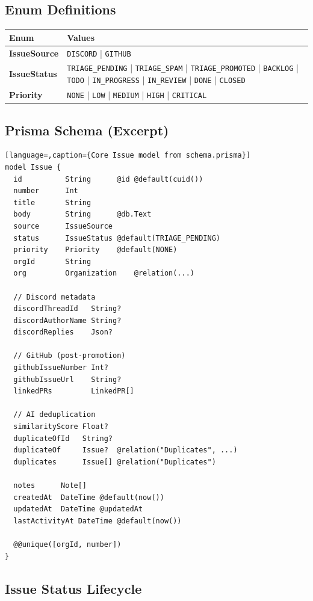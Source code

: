 \documentclass[12pt,a4paper]{report}
\begin{document}
\subsection{Enum Definitions}

\begin{longtable}{>{\bfseries}p{3cm} p{10cm}}
\toprule
Enum & Values \\
\midrule
\endhead
IssueSource & \texttt{DISCORD} | \texttt{GITHUB} \\
IssueStatus & \texttt{TRIAGE\_PENDING} | \texttt{TRIAGE\_SPAM} |
  \texttt{TRIAGE\_PROMOTED} | \texttt{BACKLOG} | \texttt{TODO} |
  \texttt{IN\_PROGRESS} | \texttt{IN\_REVIEW} | \texttt{DONE} |
  \texttt{CLOSED} \\
Priority & \texttt{NONE} | \texttt{LOW} | \texttt{MEDIUM} |
  \texttt{HIGH} | \texttt{CRITICAL} \\
\bottomrule
\end{longtable}

\subsection{Prisma Schema (Excerpt)}

\begin{lstlisting}[language=,caption={Core Issue model from schema.prisma}]
model Issue {
  id          String      @id @default(cuid())
  number      Int
  title       String
  body        String      @db.Text
  source      IssueSource
  status      IssueStatus @default(TRIAGE_PENDING)
  priority    Priority    @default(NONE)
  orgId       String
  org         Organization    @relation(...)

  // Discord metadata
  discordThreadId   String?
  discordAuthorName String?
  discordReplies    Json?

  // GitHub (post-promotion)
  githubIssueNumber Int?
  githubIssueUrl    String?
  linkedPRs         LinkedPR[]

  // AI deduplication
  similarityScore Float?
  duplicateOfId   String?
  duplicateOf     Issue?  @relation("Duplicates", ...)
  duplicates      Issue[] @relation("Duplicates")

  notes      Note[]
  createdAt  DateTime @default(now())
  updatedAt  DateTime @updatedAt
  lastActivityAt DateTime @default(now())

  @@unique([orgId, number])
}
\end{lstlisting}

\subsection{Issue Status Lifecycle}
\end{document}
